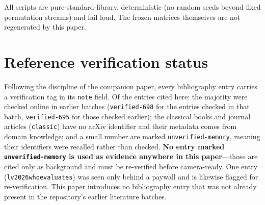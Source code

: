 \documentclass{article}
\begin{document}
All scripts are pure-standard-library, deterministic (no random seeds beyond fixed permutation streams) and
fail loud. The frozen matrices themselves are not regenerated by this paper.

\section{Reference verification status}
\label{app:refs}

Following the discipline of the companion paper, every bibliography entry carries a verification tag in its
\texttt{note} field. Of the entries cited here: the majority were checked online in earlier batches
(\texttt{verified-698} for the entries checked in that batch, \texttt{verified-695} for those checked
earlier); the classical books and journal articles (\texttt{classic}) have no arXiv identifier and their
metadata comes from domain knowledge; and a small number are marked \texttt{unverified-memory}, meaning
their identifiers were recalled rather than checked. \textbf{No entry marked \texttt{unverified-memory} is
used as evidence anywhere in this paper}---those are cited only as background and must be re-verified before
camera-ready. One entry (\texttt{lv2026whoevaluates}) was seen only behind a paywall and is likewise flagged
for re-verification. This paper introduces no bibliography entry that was not already present in the
repository's earlier literature batches.
\end{document}
